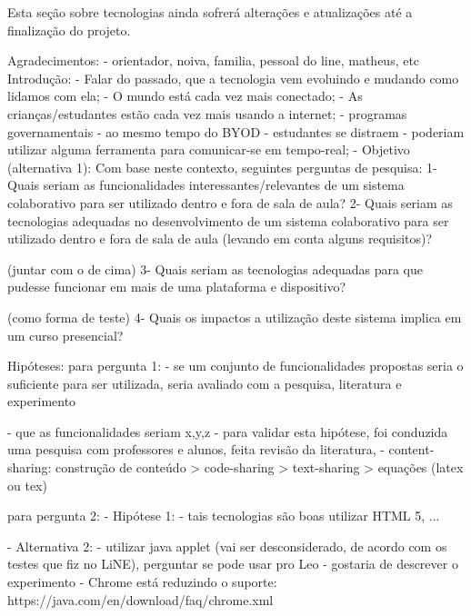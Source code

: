 Esta seção sobre tecnologias ainda sofrerá alterações e atualizações até a finalização do projeto.









        Agradecimentos: 
            - orientador, noiva, familia, pessoal do line, matheus, etc
        Introdução:
            - Falar do passado, que a tecnologia vem evoluindo e mudando como lidamos com ela;
            - O mundo está cada vez mais conectado;
            - As crianças/estudantes estão cada vez mais usando a internet;
            - programas governamentais 
            - ao mesmo tempo do BYOD
                - estudantes se distraem
                - poderiam utilizar alguma ferramenta para comunicar-se em tempo-real;
            - Objetivo (alternativa 1):
                Com base neste contexto, seguintes perguntas de pesquisa:
                    1- Quais seriam as funcionalidades interessantes/relevantes de um sistema colaborativo para ser utilizado dentro e fora de sala de aula?
                    2- Quais seriam as tecnologias adequadas no desenvolvimento de um sistema colaborativo para ser utilizado dentro e fora de sala de aula (levando em conta alguns requisitos)?

                    (juntar com o de cima) 3- Quais seriam as tecnologias adequadas para que pudesse funcionar em mais de uma plataforma e dispositivo?

                    (como forma de teste) 4- Quais os impactos a utilização deste sistema implica em um curso presencial?

                    Hipóteses:
                    para pergunta 1:
                        - se um conjunto de funcionalidades propostas seria o suficiente para ser utilizada, seria avaliado com a pesquisa, literatura e experimento

                        - que as funcionalidades seriam x,y,z
                            - para validar esta hipótese, foi conduzida uma pesquisa com professores e alunos, feita revisão da literatura, 
                        - content-sharing: construção de conteúdo > code-sharing > text-sharing > equações (latex ou tex)

                    para pergunta 2:
                        - Hipótese 1:
                            - tais tecnologias são boas utilizar HTML 5, ...

                            - Alternativa 2:
                                - utilizar java applet (vai ser desconsiderado, de acordo com os testes que fiz no LiNE), perguntar se pode usar pro Leo - gostaria de descrever o experimento
                                - Chrome está reduzindo o suporte:
                                    https://java.com/en/download/faq/chrome.xml

